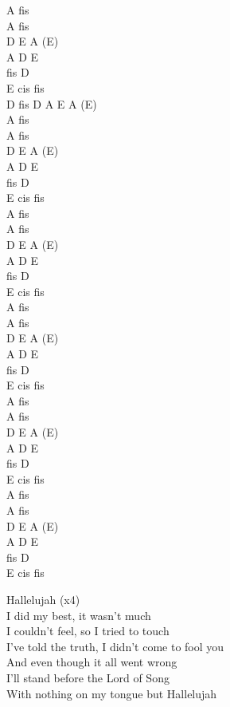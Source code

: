 \documentclass[a5paper, 10pt]{book}
\begin{document}
\begin{minipage}[t]{0.2\textwidth}
  A fis\\
  A fis\\
  D E A (E)\\
  A D E\\
  fis D\\
  E cis fis\\

  D fis D A E A (E)\\

  A fis\\
  A fis\\
  D E A (E)\\
  A D E\\
  fis D\\
  E cis fis\\

  A fis\\
  A fis\\
  D E A (E)\\
  A D E\\
  fis D\\
  E cis fis\\

  A fis\\
  A fis\\
  D E A (E)\\
  A D E\\
  fis D\\
  E cis fis\\

  A fis\\
  A fis\\
  D E A (E)\\
  A D E\\
  fis D\\
  E cis fis\\

  A fis\\
  A fis\\
  D E A (E)\\
  A D E\\
  fis D\\
  E cis fis\\
\end{minipage}
\begin{minipage}[t]{0.8\textwidth}

  \hspace*{6mm}Hallelujah (x4)\\

  I did my best, it wasn't much\\
  I couldn't feel, so I tried to touch\\
  I've told the truth, I didn't come to fool you\\
  And even though it all went wrong\\
  I'll stand before the Lord of Song\\
  With nothing on my tongue but Hallelujah\\
\end{minipage}
\end{document}
